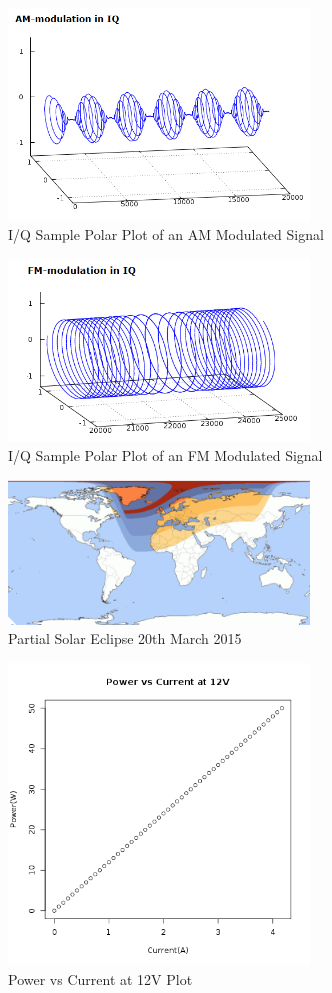 \documentclass[runningheads,a4paper]{llncs}
\begin{document}
%
\begin{figure}[here]
\centering
\includegraphics[width=8cm]{images/49}
\caption{I/Q Sample Polar Plot of an AM Modulated Signal \citep{kuisma-14}}
\label{fig:kuisma-iq-am-helix}
\end{figure}
%

%
\begin{figure}[here]
\centering
\includegraphics[width=8cm]{images/50}
\caption{I/Q Sample Polar Plot of an FM Modulated Signal \citep{kuisma-14}}
\label{fig:kuisma-iq-fm-helix}
\end{figure}
%

%
\begin{figure}[here]
	\centering
	\includegraphics[width=8cm]{images/41}
	\caption{Partial Solar Eclipse 20th March 2015}
	\label{fig:solar_eclipse_scale}
\end{figure}
%

%
\begin{figure}[here]
	\centering
	\includegraphics[width=8cm]{images/63}
	\caption{Power vs Current at 12V Plot}
	\label{fig:power_vs_current_12v}
\end{figure}
%

%


%
\end{document}
